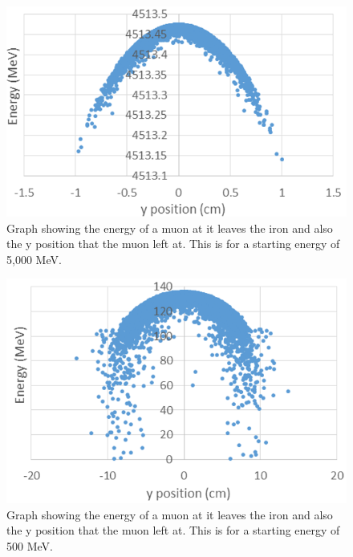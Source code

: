 \documentclass[twocolumn]{article}
\begin{document}
\begin{figure}
	\includegraphics[scale=0.3]{Images/Graph3.png}
	\caption{\label{graph3}Graph showing the energy of a muon at it leaves the iron and also the y position that the muon left at. This is for a starting energy of 5,000 MeV.}
\end{figure}
\begin{figure}
	\includegraphics[scale=0.3]{Images/Graph4.png}
	\caption{\label{graph4}Graph showing the energy of a muon at it leaves the iron and also the y position that the muon left at. This is for a starting energy of 500 MeV.}
\end{figure}
\end{document}
